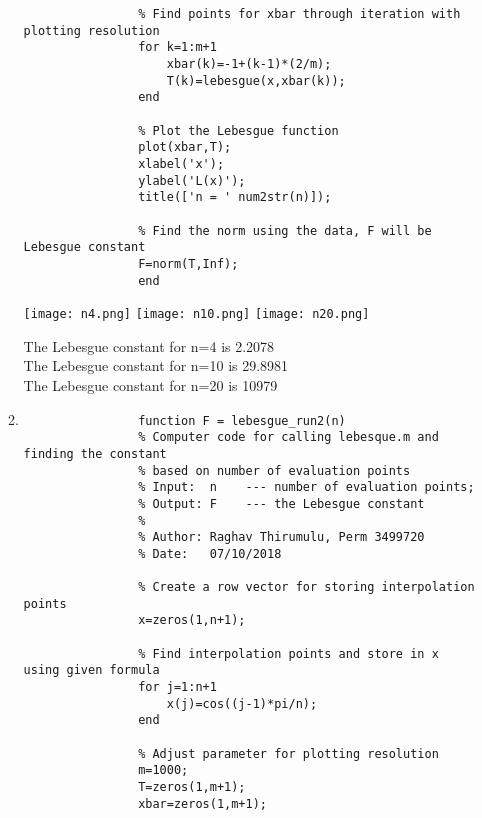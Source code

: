 \documentclass{article}
\begin{document}
\begin{enumerate}
\begin{enumerate}
\begin{lstlisting}
                % Find points for xbar through iteration with plotting resolution
                for k=1:m+1
                    xbar(k)=-1+(k-1)*(2/m);
                    T(k)=lebesgue(x,xbar(k));
                end

                % Plot the Lebesgue function
                plot(xbar,T);
                xlabel('x');
                ylabel('L(x)');
                title(['n = ' num2str(n)]);

                % Find the norm using the data, F will be Lebesgue constant
                F=norm(T,Inf);
                end
                \end{lstlisting}
                
                \begin{center}
                    \texttt{[image: n4.png]}
                    \texttt{[image: n10.png]}
                    \texttt{[image: n20.png]}
                \end{center}
                
                The Lebesgue constant for n=4 is 2.2078 \\
                The Lebesgue constant for n=10 is 29.8981 \\
                The Lebesgue constant for n=20 is 10979 \\
                
                \item %
                \begin{lstlisting}
                function F = lebesgue_run2(n)
                % Computer code for calling lebesque.m and finding the constant
                % based on number of evaluation points
                % Input:  n    --- number of evaluation points;
                % Output: F    --- the Lebesgue constant
                %
                % Author: Raghav Thirumulu, Perm 3499720
                % Date:   07/10/2018

                % Create a row vector for storing interpolation points
                x=zeros(1,n+1);

                % Find interpolation points and store in x using given formula
                for j=1:n+1
                    x(j)=cos((j-1)*pi/n);
                end

                % Adjust parameter for plotting resolution
                m=1000;
                T=zeros(1,m+1);
                xbar=zeros(1,m+1);


\end{lstlisting}
\end{enumerate}
\end{enumerate}
\end{document}
